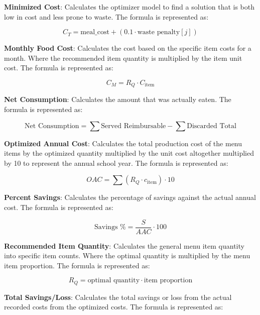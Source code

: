 \documentclass{scrartcl}
\begin{document}
\textbf{Minimized Cost}: Calculates the optimizer model to find a solution that is both low in cost and less prone to waste. The formula is represented as:

\begin{equation}
    C_T = \text{meal\_cost} + (0.1 \cdot \text{waste penalty}[j])
\end{equation}

\textbf{Monthly Food Cost}: Calculates the cost based on the specific item costs for a month. Where the recommended item quantity is multiplied by the item unit cost. The formula is represented as: 

\begin{equation}
    C_M = R_Q \cdot C_{\text{item}}
\end{equation}

\textbf{Net Consumption}: Calculates the amount that was actually eaten. The formula is represented as:

\begin{equation}
    \text{Net Consumption} = \sum \text{Served Reimbursable} - \sum \text{Discarded Total}
\end{equation}

\textbf{Optimized Annual Cost}: Calculates the total production cost of the menu items by the optimized quantity multiplied by the unit cost altogether multiplied by 10 to represent the annual school year. The formula is represented as:

\begin{equation}
    OAC = \sum(R_Q \cdot c_{\text{item}}) \cdot 10
\end{equation}

\textbf{Percent Savings}: Calculates the percentage of savings against the actual annual cost. The formula is represented as:

\begin{equation}
    \text{Savings \%} = \frac{S}{AAC} \cdot 100
\end{equation}

\textbf{Recommended Item Quantity}: Calculates the general menu item quantity into specific item counts. Where the optimal quantity is multiplied by the menu item proportion. The formula is represented as:

\begin{equation}
    R_Q = \text{optimal quantity} \cdot \text{item proportion}
\end{equation}

\textbf{Total Savings/Loss}: Calculates the total savings or loss from the actual recorded costs from the optimized costs. The formula is represented as:
\end{document}
